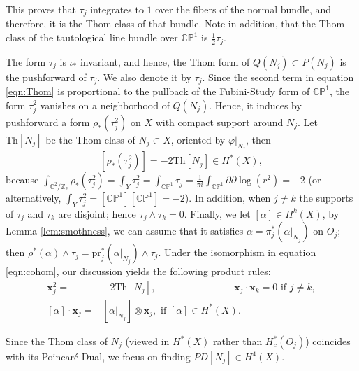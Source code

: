 \documentclass[10pt]{article}
\newcommand{\Z}{\mathbb Z}
\newcommand{\CC}{\mathbb{C}}
\newcommand{\CP}{\mathbb{CP}}
\theoremstyle{plain}
\theoremstyle{definition}
\theoremstyle{remark}
\begin{document}
This proves that $\tau_j$ integrates to $1$ over the fibers of the normal bundle, and therefore, it is the Thom class of that bundle. Note in addition, that the Thom class of the tautological line bundle over $\CP^1$ is $\frac{1}{2}\tau_j$. 



The form $\tau_j$ is $\iota_*$ invariant, and hence, the Thom form of $Q(N_j)\subset P(N_j)$ is the pushforward of $\tau_j$. We also denote it by $\tau_j$. Since the second term in equation \eqref{eqn:Thom} is proportional to the pullback of the Fubini-Study form of $\CP^1$, the form $\tau_j^2$ vanishes on a neighborhood of $Q(N_j)$. Hence, it induces by pushforward a form $\rho_*(\tau_j^2)$ on $X$ with compact support around $N_j$. Let $\mathrm{Th}[N_j]$ be the Thom class of $N_j\subset X$, oriented by $\varphi|_{N_j}$, then
\begin{equation}\label{eqn:sq-thom}
[\rho_*(\tau_j^2)]= -2\mathrm{Th}[N_j] \in H^*(X),
\end{equation}
 because 
$
\int_{\CC^2/\Z_2}{\rho_*(\tau_j^2)}= \int_{Y}{\tau_j^2}= \int_{\CP^1} \tau_j= \frac{1}{\pi i} \int_{\CC \mathbb{P}^1}  \partial \overline{\partial} \log (r^2)=-2
$ (or alternatively, $\int_{Y}{\tau_j^2}= [\CP^1][\CP^1]=-2$).
In addition, when $j\neq k$ the supports of $\tau_j$ and $\tau_k$ are disjoint; hence $\tau_j \wedge \tau_k = 0$. 
Finally, we let $[\alpha]\in H^k(X)$, by Lemma \ref{lem:smothness}, we can assume that it satisfies $\alpha=\pi_j^*(\alpha|_{N_j})$ on $O_j$; then
$
\rho^*(\alpha)\wedge \tau_j= \mathrm{pr}_j^*(\alpha|_{N_j})\wedge \tau_j.
$
Under the isomorphism in equation \eqref{eqn:cohom}, our discussion yields the following product rules:
\begin{align}
\mathbf{x}_j^2=&-2\mathrm{Th}[N_j], \qquad \qquad \qquad \qquad  \mathbf{x}_{j}\cdot \mathbf{x}_{k}=0 \mbox{ if } j\neq k, \label{eqn:prod-1} \\
[\alpha] \cdot \mathbf{x}_{j}=& [\alpha|_{N_j}]\otimes \mathbf{x}_j, \mbox{ if } [\alpha] \in H^*(X). \label{eqn:prod-2}
\end{align}




Since the Thom class of $N_j$ (viewed in $H^*(X)$ rather than $H^*_c(O_j)$) coincides with its Poincaré Dual, we focus on 
 finding $PD[N_j]\in H^4(X)$.
\end{document}
